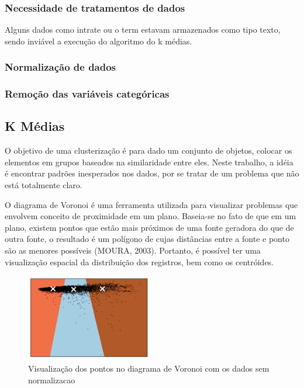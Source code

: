 \subsubsection{Necessidade de tratamentos de dados}
Alguns dados como intrate ou o term estavam armazenados como tipo texto, sendo inviável a execução do algoritmo do k médias.

\subsubsection{Normalização de dados}



\subsubsection{Remoção das variáveis categóricas}

\subsection{K Médias}

O objetivo de uma clusterização é para dado um conjunto de objetos, colocar os elementos em grupos baseados na similaridade entre eles. Neste trabalho, a idéia é encontrar padrões inesperados nos
dados, por se tratar de um problema que não está totalmente claro.

O diagrama de Voronoi é uma ferramenta utilizada para visualizar problemas que envolvem conceito de proximidade em um plano. Baseia-se no fato de que em um plano, existem pontos que estão mais próximos de uma fonte geradora do que de outra fonte, o resultado é um polígono de cujas distâncias entre a fonte e ponto são as menores possíveis (MOURA, 2003). Portanto, é possível ter uma visualização espacial da distribuição dos registros, bem como os centróides.

\begin{figure}[!ht]
\caption{Visualização dos pontos no diagrama de Voronoi com os dados sem normalizacao}
\centerline{\includegraphics[width=0.5\textwidth]{img/voronoi}}
\end{figure}


